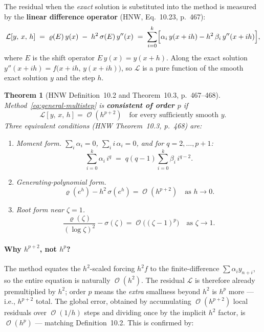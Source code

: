 \documentclass[11pt]{article}
\newtheorem{theorem}{Theorem}
\DeclareMathOperator{\OO}{\mathcal{O}}
\begin{document}
The residual when the \emph{exact} solution is substituted into the method is
measured by the \textbf{linear difference operator}
(HNW, Eq.~10.23, p.~467):
\begin{equation}
  \label{eq:L-operator}
  \mathcal{L}[y,\, x,\, h]
  \;=\; \varrho(E)\,y(x) \;-\; h^2\,\sigma(E)\,y''(x)
  \;=\; \sum_{i=0}^{k}
        \Bigl[\alpha_i\, y(x + ih) - h^2\,\beta_i\, y''(x + ih)\Bigr],
\end{equation}
where $E$ is the shift operator $E\,y(x) = y(x+h)$.  Along the exact solution
$y''(x+ih) = f\bigl(x+ih,\, y(x+ih)\bigr)$, so $\mathcal{L}$ is a pure
function of the smooth exact solution $y$ and the step $h$.

\begin{theorem}[HNW Definition~10.2 and Theorem~10.3, p.~467--468]
\label{thm:order}
Method~\eqref{eq:general-multistep} is \textbf{consistent of order $p$} if
\begin{equation}
  \label{eq:order-condition}
  \mathcal{L}[y,\, x,\, h] = \OO(h^{p+2})
  \quad \text{for every sufficiently smooth } y.
\end{equation}
Three equivalent conditions (HNW Theorem~10.3, p.~468) are:
\begin{enumerate}[label=(\roman*)]
  \item \emph{Moment form.}
    $\displaystyle\sum_i \alpha_i = 0$,\;
    $\displaystyle\sum_i i\,\alpha_i = 0$,\; and for $q = 2, \ldots, p{+}1$:
    \begin{equation}
      \label{eq:moment-conditions}
      \sum_{i=0}^{k} \alpha_i\, i^q
      \;=\; q(q-1)\sum_{i=0}^{k} \beta_i\, i^{q-2}.
    \end{equation}
  \item \emph{Generating-polynomial form.}
    \begin{equation}
      \label{eq:gen-poly-order}
      \varrho(e^h) - h^2\,\sigma(e^h) = \OO(h^{p+2})
      \quad\text{as } h \to 0.
    \end{equation}
  \item \emph{Root form near $\zeta = 1$.}
    \begin{equation}
      \frac{\varrho(\zeta)}{(\log\zeta)^2} - \sigma(\zeta)
      = \OO\!\bigl((\zeta-1)^p\bigr)
      \quad\text{as } \zeta \to 1.
    \end{equation}
\end{enumerate}
\end{theorem}

\paragraph{Why $h^{p+2}$, not $h^p$?}
The method equates the $h^2$-scaled forcing $h^2 f$ to the finite-difference
$\sum \alpha_i y_{n+i}$, so the entire equation is naturally $\OO(h^2)$.  The
residual $\mathcal{L}$ is therefore already premultiplied by $h^2$; order $p$
means the \emph{extra} smallness beyond $h^2$ is $h^p$ more --- i.e.,
$h^{p+2}$ total.  The global error, obtained by accumulating $\OO(h^{p+2})$
local residuals over $\OO(1/h)$ steps and dividing once by the implicit $h^2$
factor, is $\OO(h^p)$ --- matching Definition~10.2.  This is confirmed by:
\end{document}
